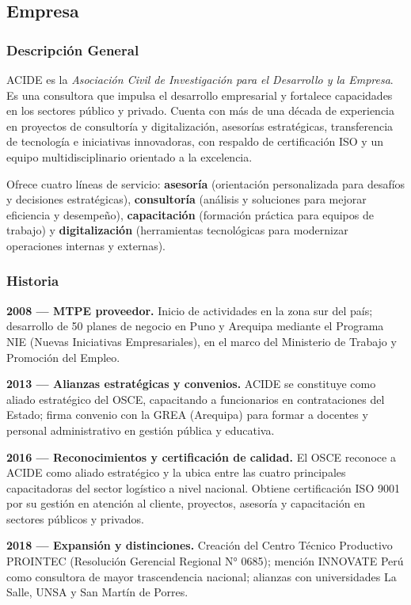 \documentclass[12pt]{article}
\begin{document}
\subsection{Empresa}

\subsubsection{Descripción General}
ACIDE es la \textit{Asociación Civil de Investigación para el Desarrollo y la Empresa}. Es una consultora que impulsa el desarrollo empresarial y fortalece capacidades en los sectores público y privado. Cuenta con más de una década de experiencia en proyectos de consultoría y digitalización, asesorías estratégicas, transferencia de tecnología e iniciativas innovadoras, con respaldo de certificación ISO y un equipo multidisciplinario orientado a la excelencia.

Ofrece cuatro líneas de servicio: \textbf{asesoría} (orientación personalizada para desafíos y decisiones estratégicas), \textbf{consultoría} (análisis y soluciones para mejorar eficiencia y desempeño), \textbf{capacitación} (formación práctica para equipos de trabajo) y \textbf{digitalización} (herramientas tecnológicas para modernizar operaciones internas y externas).

\subsubsection{Historia}
\textbf{2008 — MTPE proveedor.} Inicio de actividades en la zona sur del país; desarrollo de 50 planes de negocio en Puno y Arequipa mediante el Programa NIE (Nuevas Iniciativas Empresariales), en el marco del Ministerio de Trabajo y Promoción del Empleo.

\textbf{2013 — Alianzas estratégicas y convenios.} ACIDE se constituye como aliado estratégico del OSCE, capacitando a funcionarios en contrataciones del Estado; firma convenio con la GREA (Arequipa) para formar a docentes y personal administrativo en gestión pública y educativa.

\textbf{2016 — Reconocimientos y certificación de calidad.} El OSCE reconoce a ACIDE como aliado estratégico y la ubica entre las cuatro principales capacitadoras del sector logístico a nivel nacional. Obtiene certificación ISO 9001 por su gestión en atención al cliente, proyectos, asesoría y capacitación en sectores públicos y privados.

\textbf{2018 — Expansión y distinciones.} Creación del Centro Técnico Productivo PROINTEC (Resolución Gerencial Regional N° 0685); mención INNOVATE Perú como consultora de mayor trascendencia nacional; alianzas con universidades La Salle, UNSA y San Martín de Porres.
\end{document}
